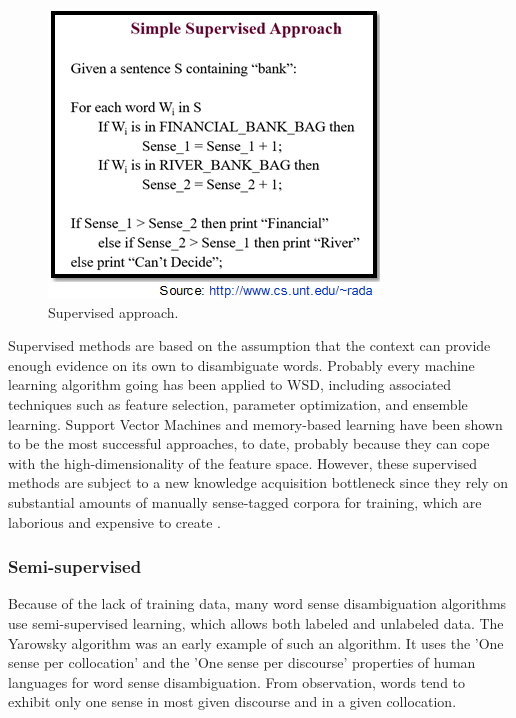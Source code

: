\begin{figure}[tbh]
	\begin{center}
		\includegraphics[width=\columnwidth]{union(sup3)}
	\end{center}
	\caption{Supervised approach.}
\end{figure}

Supervised methods are based on the assumption that the context can provide enough evidence on its own to disambiguate words. Probably every machine learning algorithm going has been applied to WSD, including associated techniques such as feature selection, parameter optimization, and ensemble learning. Support Vector Machines and memory-based learning have been shown to be the most successful approaches, to date, probably because they can cope with the high-dimensionality of the feature space. However, these supervised methods are subject to a new knowledge acquisition bottleneck since they rely on substantial amounts of manually sense-tagged corpora for training, which are laborious and expensive to create \cite{Ramos-Soto2015}.

\subsubsection*{Semi-supervised}
Because of the lack of training data, many word sense disambiguation algorithms use semi-supervised learning, which allows both labeled and unlabeled data. The Yarowsky algorithm was an early example of such an algorithm. \cite{Gartner2013} It uses the 'One sense per collocation' and the 'One sense per discourse' properties of human languages for word sense disambiguation. From observation, words tend to exhibit only one sense in most given discourse and in a given collocation.

